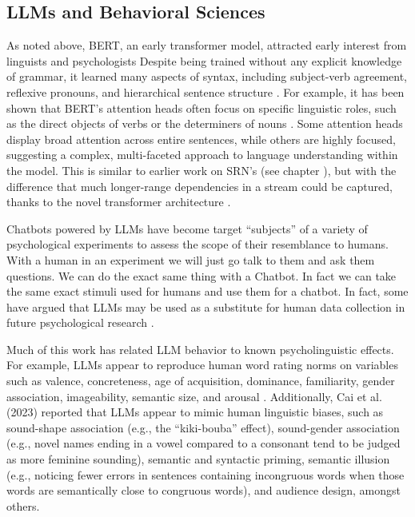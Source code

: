 \subsection{LLMs and Behavioral Sciences}


As noted above, BERT, an early transformer model, attracted early interest from linguists and psychologists  Despite being trained without any explicit knowledge of grammar, it learned many aspects of syntax, including subject-verb agreement, reflexive pronouns, and hierarchical sentence structure \cite{goldberg2019assessing, linzen2021syntactic, tenney2019bert}. For example, it has been shown that BERT's attention heads often focus on specific linguistic roles, such as the direct objects of verbs or the determiners of nouns \cite{clark2019does}. Some attention heads display broad attention across entire sentences, while others are highly focused, suggesting a complex, multi-faceted approach to language understanding within the model. This is similar to earlier work on SRN's (see chapter ), but with the difference that much longer-range dependencies in a stream could be captured, thanks to the novel transformer architecture  \cite{mcclelland2020placing}. 

Chatbots powered by LLMs have become target ``subjects'' of a variety of psychological experiments to assess the scope of their resemblance to humans. With a human in an experiment we will just go talk to them and ask them questions. We can do the exact same thing with a Chatbot. In fact we can take the same exact stimuli used for humans and use them for a chatbot. In fact, some have argued that LLMs may be used as a substitute for human data collection in future psychological research \cite{aher2023using, dillion2023can}.

Much of this work has related LLM behavior to known psycholinguistic effects. For example, LLMs appear to reproduce human word rating norms on variables such as valence, concreteness, age of acquisition, dominance, familiarity, gender association, imageability, semantic size, and arousal \cite{trott2024augment, kello2024emergent}. Additionally, Cai et al. (2023) reported that LLMs appear to mimic human linguistic biases, such as sound-shape association (e.g., the ``kiki-bouba'' effect), sound-gender association (e.g., novel names ending in a vowel compared to a consonant tend to be judged as more feminine sounding), semantic and syntactic priming, semantic illusion (e.g., noticing fewer errors in sentences containing incongruous words when those words are semantically close to congruous words), and audience design, amongst others.

